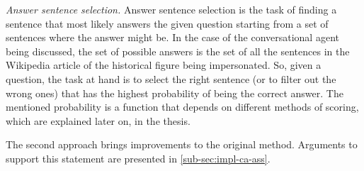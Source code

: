 {\em Answer sentence selection.} Answer sentence selection is the task of finding a sentence that most likely answers the given question starting from a set of sentences where the answer might be. In the case of the conversational agent being discussed, the set of possible answers is the set of all the sentences in the Wikipedia article of the historical figure being impersonated. So, given a question, the task at hand is to select the right sentence (or to filter out the wrong ones) that has the highest probability of being the correct answer. The mentioned probability is a function that depends on different methods of scoring, which are explained later on, in the thesis.

The second approach brings improvements to the original method. Arguments to support this statement are presented in \autoref{sub-sec:impl-ca-ass}.

